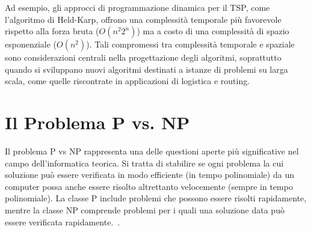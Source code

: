 Ad esempio, gli approcci di programmazione dinamica per il \gls{TSP}, come l'algoritmo di Held-Karp, offrono una complessità temporale più favorevole rispetto alla forza bruta (\(O(n^2 2^n)\)) ma a costo di una complessità di spazio esponenziale (\(O(n^2)\)). Tali compromessi tra complessità temporale e spaziale sono considerazioni centrali nella progettazione degli algoritmi, soprattutto quando si sviluppano nuovi algoritmi destinati a istanze di problemi su larga scala, come quelle riscontrate in applicazioni di logistica e routing.

\section{Il Problema \gls{P} vs. \gls{NP} }

Il problema \gls{P} vs \gls{NP} rappresenta una delle questioni aperte più significative nel campo dell'informatica teorica. Si tratta di stabilire se ogni problema la cui soluzione può essere verificata in modo efficiente (in tempo polinomiale) da un computer possa anche essere risolto altrettanto velocemente (sempre in tempo polinomiale). La classe \gls{P} include problemi che possono essere risolti rapidamente, mentre la classe \gls{NP} comprende problemi per i quali una soluzione data può essere verificata rapidamente.~\cite{PvsNP}.
